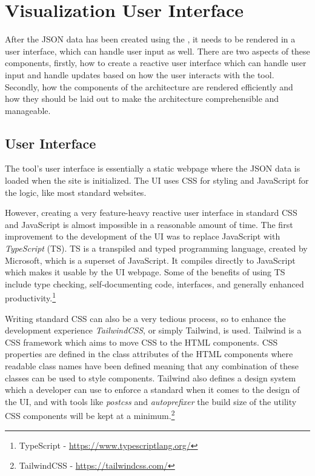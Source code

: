 \section{Visualization User Interface}
After the JSON data has been created using the \javatoolname[], it needs to be rendered in a user interface, which can handle user input as well.
There are two aspects of these components, firstly, how to create a reactive user interface which can handle user input and handle updates based on how the user interacts with the tool. Secondly, how the components of the architecture are rendered efficiently and how they should be laid out to make the architecture comprehensible and manageable.

\subsection{User Interface}
The tool's user interface is essentially a static webpage where the JSON data is loaded when the site is initialized.
The UI uses CSS for styling and JavaScript for the logic, like most standard websites.

However, creating a very feature-heavy reactive user interface in standard CSS and JavaScript is almost impossible in a reasonable amount of time.
The first improvement to the development of the UI was to replace JavaScript with \emph{TypeScript} (TS).
TS is a transpiled and typed programming language, created by Microsoft, which is a superset of JavaScript. It compiles directly to JavaScript which makes it usable by the UI webpage.
Some of the benefits of using TS include type checking, self-documenting code, interfaces, and generally enhanced productivity.\footnote{TypeScript - \url{https://www.typescriptlang.org/}}

Writing standard CSS can also be a very tedious process, so to enhance the development experience \emph{TailwindCSS}, or simply Tailwind, is used.
Tailwind is a CSS framework which aims to move CSS to the HTML components. CSS properties are defined in the class attributes of the HTML components where readable class names have been defined meaning that any combination of these classes can be used to style components.
Tailwind also defines a design system which a developer can use to enforce a standard when it comes to the design of the UI, and with tools like \emph{postcss} and \emph{autoprefixer} the build size of the utility CSS components will be kept at a minimum.\footnote{TailwindCSS - \url{https://tailwindcss.com/}}

